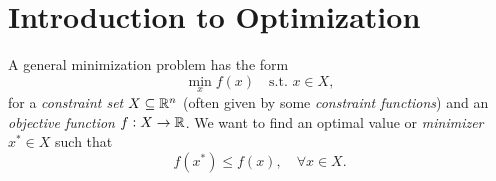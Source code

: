 \documentclass{article}
\begin{document}
\section{Introduction to Optimization}

\label{s:optimization-form}

A general minimization problem has the form
\begin{equation*}
  \min_{x} f(x) \quad \text{s.t. } x \in X,
\end{equation*}
for a \emph{constraint set} \(X \subseteq \mathbb{R}^n\) (often given by some \emph{constraint functions})
and an \emph{objective function} \(f: X \to \mathbb{R}\).  We want to find an optimal value or
\emph{minimizer} \(x^* \in X\) such that
\begin{equation*}
  f(x^*) \leq f(x), \quad \forall x \in X.
\end{equation*}


\label{s:optimization-types}
\end{document}
